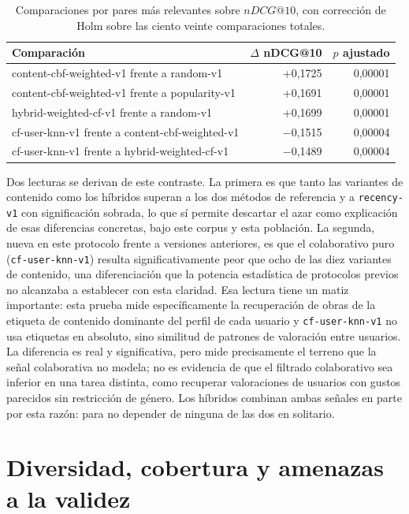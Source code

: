 \begin{table}[H]
\centering
\caption{Comparaciones por pares más relevantes sobre \(nDCG@10\), con corrección de Holm
sobre las ciento veinte comparaciones totales.}\label{tab:significacion}
\small
\begin{tabularx}{\textwidth}{@{}Yrr@{}}
\textnormal{Comparación} & \textnormal{\(\Delta\) nDCG@10} & \textnormal{\(p\) ajustado} \\
\hline
content-cbf-weighted-v1 frente a random-v1 & +0{,}1725 & 0{,}00001 \\
content-cbf-weighted-v1 frente a popularity-v1 & +0{,}1691 & 0{,}00001 \\
hybrid-weighted-cf-v1 frente a random-v1 & +0{,}1699 & 0{,}00001 \\
cf-user-knn-v1 frente a content-cbf-weighted-v1 & \(-\)0{,}1515 & 0{,}00004 \\
cf-user-knn-v1 frente a hybrid-weighted-cf-v1 & \(-\)0{,}1489 & 0{,}00004 \\
\end{tabularx}
\end{table}

Dos lecturas se derivan de este contraste. La primera es que tanto las variantes de contenido
como los híbridos superan a los dos métodos de referencia y a \texttt{recency-v1} con significación
sobrada, lo que sí permite descartar el azar como explicación de esas diferencias concretas,
bajo este corpus y esta población. La segunda, nueva en este protocolo frente a versiones
anteriores, es que el colaborativo puro (\texttt{cf-user-knn-v1}) resulta significativamente
peor que ocho de las diez variantes de contenido, una diferenciación que la potencia
estadística de protocolos previos no alcanzaba a establecer con esta claridad. Esa lectura
tiene un matiz importante: esta prueba mide específicamente la recuperación de obras de la
etiqueta de contenido dominante del perfil de cada usuario y \texttt{cf-user-knn-v1} no usa
etiquetas en absoluto, sino similitud de patrones de valoración entre usuarios. La diferencia
es real y significativa, pero mide precisamente el terreno que la señal colaborativa no
modela; no es evidencia de que el filtrado colaborativo sea inferior en una tarea distinta,
como recuperar valoraciones de usuarios con gustos parecidos sin restricción de género. Los
híbridos combinan ambas señales en parte por esta razón: para no depender de ninguna de las
dos en solitario.

\section{Diversidad, cobertura y amenazas a la validez}\label{sec:exp-amenazas}

